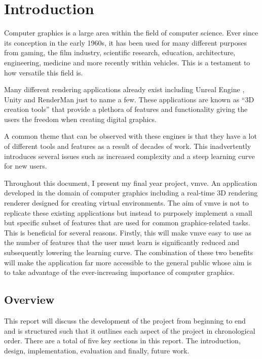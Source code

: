 \documentclass[11pt]{article}
\begin{document}
\pagebreak

\pagestyle{fancy}

\section{Introduction}

Computer graphics is a large area within the field of computer science. Ever
since its conception in the early 1960s, it has been used for many different
purposes from gaming, the film industry, scientific research, education,
architecture, engineering, medicine and more recently within vehicles. This is a
testament to how versatile this field is.

Many different rendering applications already exist including Unreal
Engine \cite{unreal_engine}, Unity \cite{unity} and RenderMan \cite{render_man}
just to name a few. These applications are known as ``3D creation tools''
that provide a plethora of features and functionality giving the users the
freedom when creating digital graphics.

A common theme that can be observed with these engines is that they have a lot
of different tools and features as a result of decades of work. This
inadvertently introduces several issues such as increased complexity and a steep
learning curve for new users.

Throughout this document, I present my final year project, \gls{vmve}. An
application developed in the domain of computer graphics including a real-time
3D rendering renderer designed for creating virtual environments. The aim of
\gls{vmve} is not to replicate these existing applications but instead to
purposely implement a small but specific subset of features that are used for
common graphics-related tasks. This is beneficial for several reasons. Firstly,
this will make \gls{vmve} easy to use as the number of features that the user
must learn is significantly reduced and subsequently lowering the learning
curve. The combination of these two benefits will make the application far more
accessible to the general public whose aim is to take advantage of the
ever-increasing importance of computer graphics.

\subsection{Overview}
This report will discuss the development of the project from beginning to end and 
is structured such that it outlines each aspect of the project in chronological
order. There are a total of five key sections in this report. The introduction,
design, implementation, evaluation and finally, future work.
\end{document}
